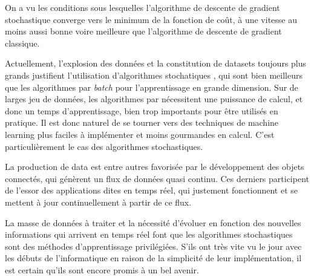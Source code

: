 \documentclass{article}
\begin{document}
On a vu les conditions sous lesquelles l'algorithme de descente de gradient stochastique converge vers le minimum de la fonction de coût, à une vitesse au moins aussi bonne voire meilleure que l'algorithme de descente de gradient classique.
\bigskip

Actuellement, l'explosion des données et la constitution de datasets toujours plus grands justifient l'utilisation d'algorithmes stochatiques \cite{bottou-2010}, qui sont bien meilleurs que les algorithmes par \emph{batch} pour l'apprentissage en grande dimension. Sur de larges jeu de données, les algorithmes par  nécessitent une puissance de calcul, et donc un temps d'apprentissage, bien trop importants pour être utilisés en pratique. Il est donc naturel de se tourner vers des techniques de machine learning plus faciles à implémenter et moins gourmandes en calcul. C'est particulièrement le cas des algorithmes stochastiques.
\bigskip

La production de data est entre autres favorisée par le développement des objets connectés, qui génèrent un flux de données quasi continu. Ces derniers participent de l'essor des applications dites en temps réel, qui justement fonctionnent et se mettent à jour continuellement à partir de ce flux. 
\bigskip

La masse de données à traiter et la nécessité d'évoluer en fonction des nouvelles informations qui arrivent en temps réel font que les algorithmes stochastiques sont des méthodes d'apprentissage privilégiées. S'ils ont très vite  vu le jour avec les débuts de l'informatique en raison de la simplicité de leur implémentation, il est certain qu'ils sont encore promis à un bel avenir.
\newpage



\end{document}
